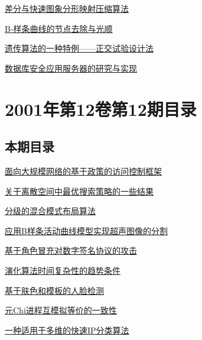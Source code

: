 \documentclass[a4paper]{article}
\begin{document}
\href{http://www.jos.org.cn/ch/reader/download_pdf.aspx?file_no=20010117&year_id=2001&quarter_id=1&falg=1}{差分与快速图象分形映射压缩算法}

\href{http://www.jos.org.cn/ch/reader/download_pdf.aspx?file_no=20010118&year_id=2001&quarter_id=1&falg=1}{B-样条曲线的节点去除与光顺}

\href{http://www.jos.org.cn/ch/reader/download_pdf.aspx?file_no=20010119&year_id=2001&quarter_id=1&falg=1}{遗传算法的一种特例——正交试验设计法}

\href{http://www.jos.org.cn/ch/reader/download_pdf.aspx?file_no=20010120&year_id=2001&quarter_id=1&falg=1}{数据库安全应用服务器的研究与实现}


\section{\textbf{2001年第12卷第12期目录}}
\subsection{本期目录}
\href{http://www.jos.org.cn/ch/reader/download_pdf.aspx?file_no=20011201&year_id=2001&quarter_id=12&falg=1}{面向大规模网络的基于政策的访问控制框架}

\href{http://www.jos.org.cn/ch/reader/download_pdf.aspx?file_no=20011202&year_id=2001&quarter_id=12&falg=1}{关于离散空间中最优搜索策略的一些结果}

\href{http://www.jos.org.cn/ch/reader/download_pdf.aspx?file_no=20011203&year_id=2001&quarter_id=12&falg=1}{分级的混合模式布局算法}

\href{http://www.jos.org.cn/ch/reader/download_pdf.aspx?file_no=20011204&year_id=2001&quarter_id=12&falg=1}{应用B样条活动曲线模型实现超声图像的分割}

\href{http://www.jos.org.cn/ch/reader/download_pdf.aspx?file_no=20011205&year_id=2001&quarter_id=12&falg=1}{基于角色冒充对数字签名协议的攻击}

\href{http://www.jos.org.cn/ch/reader/download_pdf.aspx?file_no=20011206&year_id=2001&quarter_id=12&falg=1}{演化算法时间复杂性的趋势条件}

\href{http://www.jos.org.cn/ch/reader/download_pdf.aspx?file_no=20011207&year_id=2001&quarter_id=12&falg=1}{基于肤色和模板的人脸检测}

\href{http://www.jos.org.cn/ch/reader/download_pdf.aspx?file_no=20011208&year_id=2001&quarter_id=12&falg=1}{元Chi进程互模拟等价的一致性}

\href{http://www.jos.org.cn/ch/reader/download_pdf.aspx?file_no=20011209&year_id=2001&quarter_id=12&falg=1}{一种适用于多维的快速IP分类算法}
\end{document}
